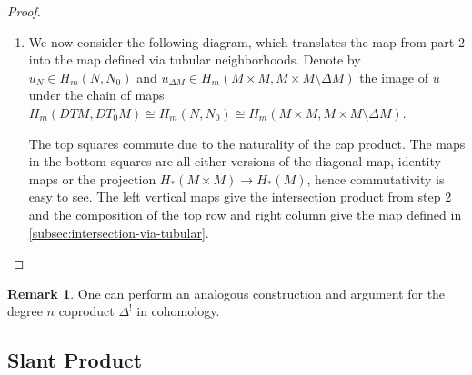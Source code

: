 \documentclass{scrartcl}
\theoremstyle{plain}
\theoremstyle{definition}
\newtheorem{remark}[theorem]{Remark}
\newcommand{\capp}{\mathbin{\frown}}
\newcommand{\iso}{\cong}
\begin{document}
\begin{proof}
\begin{enumerate}
        \item We now consider the following diagram, which translates the map from part 2 into the map defined via tubular neighborhoods.  Denote by $u_N\in H_m(N, N_0)$ and $u_{\Delta M}\in H_m(M\times M, M\times M\setminus \Delta M)$ the image of $u$ under the chain of maps $H_m(DTM, DT_0M) \iso H_m(N, N_0) \iso H_m(M\times M, M\times M\setminus \Delta M)$.
        
        \begin{center}
        \end{center}

        The top squares commute due to the naturality of the cap product. The maps in the bottom squares are all either versions of the diagonal map, identity maps or the projection $H_*(M\times M)\to H_*(M)$, hence commutativity is easy to see. The left vertical maps give the intersection product from step 2 and the composition of the top row and right column give the map defined in \ref{subsec:intersection-via-tubular}.
    \end{enumerate}

\end{proof}

\begin{remark}
    One can perform an analogous construction and argument for the degree $n$ coproduct $\Delta^!$ in cohomology.
\end{remark}


\subsection{Slant Product}\label{subsec:slant_product}
\end{document}
